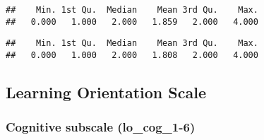 \documentclass[]{article}
\newenvironment{Shaded}{\begin{snugshade}}{\end{snugshade}}
\newcommand{\KeywordTok}[1]{\textcolor[rgb]{0.13,0.29,0.53}{\textbf{#1}}}
\newcommand{\DataTypeTok}[1]{\textcolor[rgb]{0.13,0.29,0.53}{#1}}
\newcommand{\DecValTok}[1]{\textcolor[rgb]{0.00,0.00,0.81}{#1}}
\newcommand{\StringTok}[1]{\textcolor[rgb]{0.31,0.60,0.02}{#1}}
\newcommand{\CommentTok}[1]{\textcolor[rgb]{0.56,0.35,0.01}{\textit{#1}}}
\newcommand{\OtherTok}[1]{\textcolor[rgb]{0.56,0.35,0.01}{#1}}
\newcommand{\OperatorTok}[1]{\textcolor[rgb]{0.81,0.36,0.00}{\textbf{#1}}}
\newcommand{\NormalTok}[1]{#1}
\begin{document}
\begin{verbatim}
##    Min. 1st Qu.  Median    Mean 3rd Qu.    Max. 
##   0.000   1.000   2.000   1.859   2.000   4.000
\end{verbatim}

\begin{Shaded}
\end{Shaded}

\begin{verbatim}
##    Min. 1st Qu.  Median    Mean 3rd Qu.    Max. 
##   0.000   1.000   2.000   1.808   2.000   4.000
\end{verbatim}

\subsection{Learning Orientation
Scale}\label{learning-orientation-scale}

\subsubsection{Cognitive subscale
(lo\_cog\_1-6)}\label{cognitive-subscale-lo_cog_1-6}

\begin{Shaded}
\end{Shaded}
\end{document}
